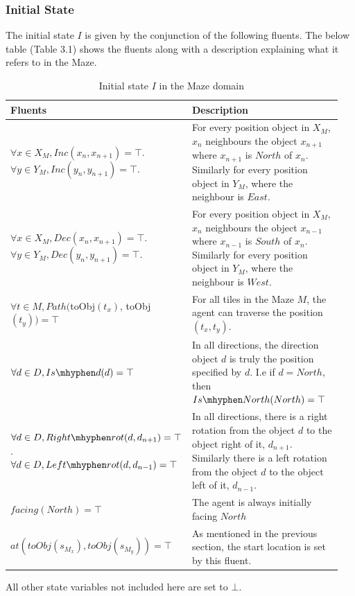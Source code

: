 \subsubsection{Initial State}
The initial state $I$ is given by the conjunction of the following fluents. The below table (Table 3.1) shows the fluents along with a description explaining what it refers to in the Maze.

\begin{table}[ht]
\centering
\begin{tabular}{|p{0.473\linewidth}|p{0.473\linewidth}|}
\hline
Fluents & Description \\\hline
$\forall x \in X_M, Inc(x_n, x_{n+1}) = \top$. $\forall y \in Y_M, Inc(y_n, y_{n+1}) = \top$.& For every position object in $X_M$, $x_{n}$ neighbours the object $x_{n+1}$ where $x_{n+1}$ is $North$ of $x_n$. Similarly for every position object in $Y_M$, where the neighbour is $East$. \\\hline
$\forall x \in X_M, Dec(x_n, x_{n+1}) = \top$. $\forall y \in Y_M, Dec(y_n, y_{n+1}) = \top$.& For every position object in $X_M$, $x_n$ neighbours the object $x_{n-1}$ where $x_{n-1}$ is $South$ of $x_n$. Similarly for every position object in $Y_M$, where the neighbour is $West$. \\\hline
$\forall t \in M, Path($toObj$(t_x)$, toObj$(t_y)) = \top$& For all tiles in the Maze $M$, the agent can traverse the position $(t_x, t_y)$.\\ \hline
$\forall d \in D, Is\mhyphen d(d) = \top$& In all directions, the direction object $d$ is truly the position specified by $d$. I.e if $d = North$, then $Is\mhyphen North(North) = \top$~ \\\hline
$\forall d \in D, Right\mhyphen rot(d, d_{n+1}) = \top$. $\forall d \in D, Left \mhyphen rot(d, d_{n-1}) = \top$& In all directions, there is a right rotation from the object $d$ to the object right of it, $d_{n+1}$. Similarly there is a left rotation from the object $d$ to the object left of it, $d_{n-1}$. \\\hline
$facing(North) = \top$& The agent is always initially facing $North$ \\\hline
$at(toObj(s_{M_x}), toObj(s_{M_y})) = \top$& As mentioned in the previous section, the start location is set by this fluent. \\\hline
\end{tabular}
\caption{Initial state $I$ in the Maze domain}
\end{table}
\noindent All other state variables not included here are set to $\bot$.

